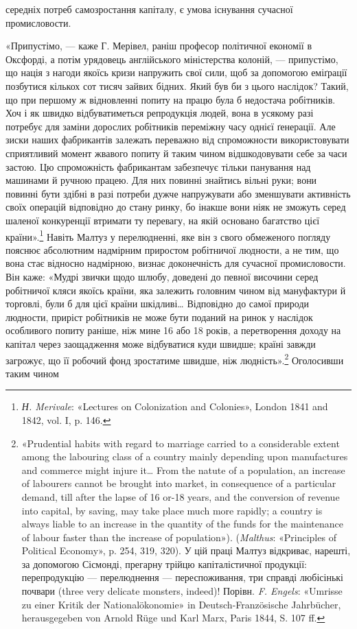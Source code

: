 \parcont{}  %
середніх потреб самозростання капіталу, є умова існування сучасної
промисловости.

«Припустімо, — каже Г. Мерівел, раніш професор політичної
економії в Оксфорді, а потім урядовець англійського міністерства
колоній, — припустімо, що нація з нагоди якоїсь кризи напружить
свої сили, щоб за допомогою еміґрації позбутися кількох сот
тисяч зайвих бідних. Який був би з цього наслідок? Такий, що
при першому ж відновленні попиту на працю була б недостача
робітників. Хоч і як швидко відбуватиметься репродукція людей,
вона в усякому разі потребує для заміни дорослих робітників
переміжну часу однієї ґенерації. Але зиски наших фабрикантів
залежать переважно від спроможности використовувати сприятливий
момент жвавого попиту й таким чином відшкодовувати
себе за часи застою. Цю спроможність фабрикантам забезпечує
тільки панування над машинами й ручною працею. Для них
повинні знайтись вільні руки; вони повинні бути здібні в разі
потреби дужче напружувати або зменшувати активність своїх
операцій відповідно до стану ринку, бо інакше вони ніяк не зможуть
серед шаленої конкуренції втримати ту перевагу, на якій
основано багатство цієї країни».\footnote{
\emph{Н. Merivale}: «Lectures on Colonization and Colonies», London 1841
and 1842, vol. I, p. 146.
} Навіть Малтуз у перелюдненні,
яке він з свого обмеженого погляду пояснює абсолютним
надмірним приростом робітничої людности, а не тим, що вона
стає відносно надмірною, визнає доконечність для сучасної промисловости.
Він каже: «Мудрі звички щодо шлюбу, доведені
до певної височини серед робітничої кляси якоїсь країни, яка
залежить головним чином від мануфактури й торговлі, були б
для цієї країни шкідливі\dots{} Відповідно до самої природи людности,
приріст робітників не може бути поданий на ринок у наслідок
особливого попиту раніше, ніж мине 16 або 18 років, а перетворення
доходу на капітал через заощадження може відбуватися
куди швидше; країні завжди загрожує, що її робочий фонд зростатиме
швидше, ніж людність».\footnote{
«Prudential habits with regard to marriage carried to a considerable
extent among the labouring class of a country mainly depending upon manufactures
and commerce might injure it\dots{} From the natute of a population,
an increase of labourers cannot be brought into market, in consequence
of a particular demand, till after the lapse of 16 or-18 years, and the conversion
of revenue into capital, by saving, may take place much more rapidly;
a country is always liable to an increase in the quantity of the funds
for the maintenance of labour faster than the increase of population»).
(\emph{Malthus}: «Principles of Political Economy», p. 254, 319, 320). У цій праці
Малтуз відкриває, нарешті, за допомогою Сісмонді, прегарну трійцю капіталістичної
продукції: перепродукцію — перелюднення — переспоживання,
три справді любісінькі почвари (three very delicate monsters, indeed)!
Порівн. \emph{F. Engels}: «Umrisse zu einer Kritik der Nationalökonomie» in
Deutsch-Französische Jahrbücher, herausgegeben von Arnold Rüge
und Karl Marx, Paris 1844, S. 107 ff.
} Оголосивши таким чином

